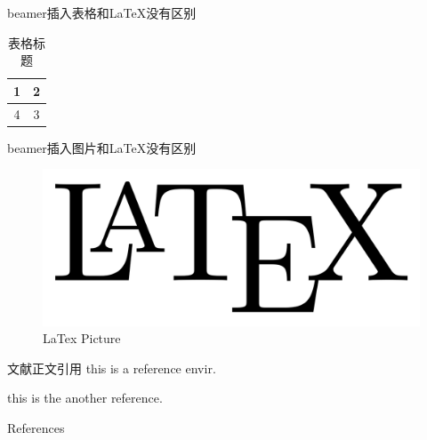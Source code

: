 \documentclass[10pt]{beamer}
\begin{document}
	\begin{frame}[c]{beamer插入表格和\LaTeX 没有区别}
		\begin{table}[t] %
			\centering
			\caption{表格标题\label{tab:biaoge}}
		\begin{tabular}{|c|c|}
			\hline 
			1 & 2 \\ 
			\hline 
			4 & 3 \\ 
			\hline 
		\end{tabular} 
		\end{table}
	\end{frame}

	\begin{frame}[c]{beamer插入图片和\LaTeX 没有区别}
	\begin{table}[htb!] %
		\begin{figure}
			\centering
			\includegraphics[width=0.9\linewidth]{logo/LaTex}
			\caption{LaTex Picture}
			\label{fig:LaTex}
		\end{figure}
	\end{table}	
	\end{frame}

	\begin{frame}[c]{文献正文引用}
		this is\cite{.2004b} a reference\cite{RN142} envir\cite{.2005b}.
		
		this\cite{.2004d} is the\cite{RN142} another\cite{RN94} reference\cite{.2005c}.
	\end{frame}

	\begin{frame}[t,allowframebreaks]{References} %
	\def\newblock{}
	
	\end{frame}
\end{document}
